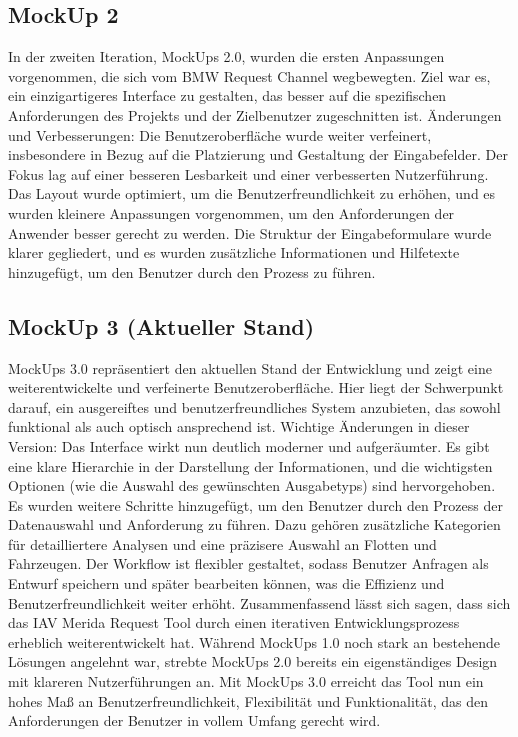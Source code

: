 \subsection*{MockUp 2}
In der zweiten Iteration, MockUps 2.0, wurden die ersten Anpassungen vorgenommen, die sich vom BMW Request Channel wegbewegten. Ziel war es, ein einzigartigeres Interface zu gestalten, das besser auf die spezifischen Anforderungen des Projekts und der Zielbenutzer zugeschnitten ist.
Änderungen und Verbesserungen:
Die Benutzeroberfläche wurde weiter verfeinert, insbesondere in Bezug auf die Platzierung und Gestaltung der Eingabefelder. Der Fokus lag auf einer besseren Lesbarkeit und einer verbesserten Nutzerführung.
Das Layout wurde optimiert, um die Benutzerfreundlichkeit zu erhöhen, und es wurden kleinere Anpassungen vorgenommen, um den Anforderungen der Anwender besser gerecht zu werden.
Die Struktur der Eingabeformulare wurde klarer gegliedert, und es wurden zusätzliche Informationen und Hilfetexte hinzugefügt, um den Benutzer durch den Prozess zu führen.
\subsection*{MockUp 3 (Aktueller Stand)}
MockUps 3.0 repräsentiert den aktuellen Stand der Entwicklung und zeigt eine weiterentwickelte und verfeinerte Benutzeroberfläche. Hier liegt der Schwerpunkt darauf, ein ausgereiftes und benutzerfreundliches System anzubieten, das sowohl funktional als auch optisch ansprechend ist.
Wichtige Änderungen in dieser Version:
Das Interface wirkt nun deutlich moderner und aufgeräumter. Es gibt eine klare Hierarchie in der Darstellung der Informationen, und die wichtigsten Optionen (wie die Auswahl des gewünschten Ausgabetyps) sind hervorgehoben.
Es wurden weitere Schritte hinzugefügt, um den Benutzer durch den Prozess der Datenauswahl und Anforderung zu führen. Dazu gehören zusätzliche Kategorien für detailliertere Analysen und eine präzisere Auswahl an Flotten und Fahrzeugen.
Der Workflow ist flexibler gestaltet, sodass Benutzer Anfragen als Entwurf speichern und später bearbeiten können, was die Effizienz und Benutzerfreundlichkeit weiter erhöht.
\newline
Zusammenfassend lässt sich sagen, dass sich das IAV Merida Request Tool durch einen iterativen Entwicklungsprozess erheblich weiterentwickelt hat. Während MockUps 1.0 noch stark an bestehende Lösungen angelehnt war, strebte MockUps 2.0 bereits ein eigenständiges Design mit klareren Nutzerführungen an. Mit MockUps 3.0 erreicht das Tool nun ein hohes Maß an Benutzerfreundlichkeit, Flexibilität und Funktionalität, das den Anforderungen der Benutzer in vollem Umfang gerecht wird.
\label{chap:kapitel5}